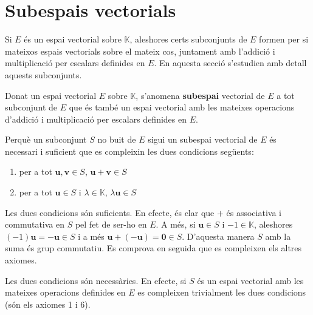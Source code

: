 \section{Subespais vectorials}

Si $E$ és un espai vectorial sobre $\mathbb{K}$, aleshores certs
subconjunts de $E$ formen per si mateixos espais vectorials sobre el
mateix cos, juntament amb l’addició i multiplicació per escalars
definides en $E$. En aquesta secció s'estudien amb detall aquests
subconjunts.

\begin{definicio}
Donat un espai vectorial $E$ sobre $\mathbb{K}$, s’anomena \textbf{%
subespai} vectorial de $E$ a tot subconjunt de $E$ que és també un espai vectorial amb les mateixes operacions d'addició i
multiplicació per escalars definides en $E$.
\end{definicio}

\begin{teorema}
Perquè un subconjunt $S$ no buit de $E$ sigui un subespai vectorial
de $E$ és necessari i suficient que es compleixin les dues condicions
següents:

\begin{enumerate}
\item per a tot $\mathbf{u},\mathbf{v}\in S$, $\mathbf{u}+\mathbf{v}\in S$

\item per a tot $\mathbf{u}\in S$ i $\lambda \in \mathbb{K}$, $\lambda 
\mathbf{u}\in S$
\end{enumerate}

\end{teorema}
\begin{prova}
Les dues condicions són suficients. En efecte, és clar que $+$ és
associativa i commutativa en $S$ pel fet de ser-ho en $E$. A més, si $%
\mathbf{u}\in S$ i $-1\in \mathbb{K}$, aleshores $(-1)\mathbf{u}=-\mathbf{u}%
\in S$ i a més $\mathbf{u}+(-\mathbf{u})=\mathbf{0}\in S$. D’aquesta manera 
$S$ amb la suma és grup commutatiu. Es comprova en seguida que es compleixen
els altres axiomes.

Les dues condicions són necessàries. En efecte, si $S$ és un espai
vectorial amb les mateixes operacions definides en $E$ es compleixen
trivialment les dues condicions (són els axiomes 1 i 6).
\end{prova}

